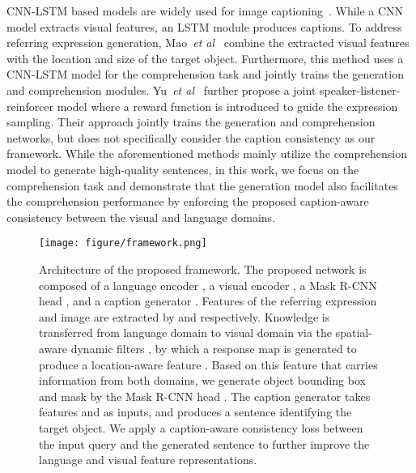 \documentclass{bmvc2k}
\def\etal{\emph{et al}\bmvaOneDot}
\begin{document}
CNN-LSTM based models are widely used for image captioning~\cite{Karpathy_CVPR_2015,Rennie_CVPR_2017,Vinyals_CVPR_2015,Xu_ICML_2015}.
While a CNN model extracts visual features, an LSTM module produces captions.
To address referring expression generation, Mao~\etal~\cite{Mao_CVPR_2016} combine the extracted visual features with the location and size of the target object.
Furthermore, this method uses a CNN-LSTM model for the comprehension task and jointly trains the generation and comprehension modules.
Yu~\etal~\cite{Yu_CVPR_2017} further propose a joint speaker-listener-reinforcer model where a reward function is introduced to guide the expression sampling.
Their approach jointly trains the generation and comprehension networks, but does not specifically consider the caption consistency as our framework.
While the aforementioned methods mainly utilize the comprehension model to generate high-quality sentences, in this work, we focus on the comprehension task and demonstrate that the generation model also facilitates the comprehension performance by enforcing the proposed caption-aware consistency between the visual and language domains. 
\begin{figure}[t]
	\centering
	\texttt{[image: figure/framework.png]}
	\caption{Architecture of the proposed framework. 
The proposed network is composed of a language encoder , a visual encoder , a Mask R-CNN head , and a caption generator . 
Features of the referring expression  and image  are extracted by  and  respectively. 
Knowledge is transferred from language domain to visual domain via the spatial-aware dynamic filters , by which a response map  is generated to produce a location-aware feature . 
Based on this feature  that carries information from both domains, we generate object bounding box and mask by the Mask R-CNN head . The caption generator takes features  and  as inputs, and produces a sentence identifying the target object. 
We apply a caption-aware consistency loss between the input query  and the generated sentence  to further improve the language and visual feature representations.}
	\label{fig:framework}
	\vspace{-3mm}
\end{figure}
\end{document}
